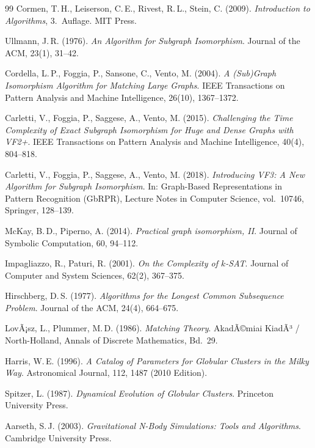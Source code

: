 ﻿\documentclass[a4paper,12pt]{report}
\theoremstyle{definition}
\begin{document}
\begin{thebibliography}{99}
Cormen, T.\,H., Leiserson, C.\,E., Rivest, R.\,L., Stein, C. (2009). \textit{Introduction to Algorithms}, 3.\ Auflage. MIT Press.

Ullmann, J.\,R. (1976). \textit{An Algorithm for Subgraph Isomorphism}. Journal of the ACM, 23(1), 31--42.

Cordella, L.\,P., Foggia, P., Sansone, C., Vento, M. (2004). \textit{A (Sub)Graph Isomorphism Algorithm for Matching Large Graphs}. IEEE Transactions on Pattern Analysis and Machine Intelligence, 26(10), 1367--1372.

Carletti, V., Foggia, P., Saggese, A., Vento, M. (2015). \textit{Challenging the Time Complexity of Exact Subgraph Isomorphism for Huge and Dense Graphs with VF2+}. IEEE Transactions on Pattern Analysis and Machine Intelligence, 40(4), 804--818.

Carletti, V., Foggia, P., Saggese, A., Vento, M. (2018). \textit{Introducing VF3: A New Algorithm for Subgraph Isomorphism}. In: Graph-Based Representations in Pattern Recognition (GbRPR), Lecture Notes in Computer Science, vol.~10746, Springer, 128--139.

McKay, B.\,D., Piperno, A. (2014). \textit{Practical graph isomorphism, II}. Journal of Symbolic Computation, 60, 94--112.

Impagliazzo, R., Paturi, R. (2001). \textit{On the Complexity of $k$-SAT}. Journal of Computer and System Sciences, 62(2), 367--375.

Hirschberg, D.\,S. (1977). \textit{Algorithms for the Longest Common Subsequence Problem}. Journal of the ACM, 24(4), 664--675.

LovÃ¡sz, L., Plummer, M.\,D. (1986). \textit{Matching Theory}. AkadÃ©miai KiadÃ³ / North-Holland, Annals of Discrete Mathematics, Bd.~29.


Harris, W.\,E. (1996). \textit{A Catalog of Parameters for Globular Clusters in the Milky Way}. Astronomical Journal, 112, 1487 (2010 Edition).

Spitzer, L. (1987). \textit{Dynamical Evolution of Globular Clusters}. Princeton University Press.

Aarseth, S.\,J. (2003). \textit{Gravitational N-Body Simulations: Tools and Algorithms}. Cambridge University Press.


\end{thebibliography}
\end{document}
